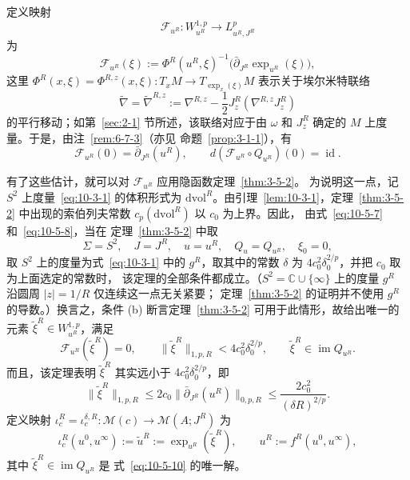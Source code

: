 定义映射
\[
  \mathcal F_{u^R}:W_{u^R}^{1,p}\longrightarrow L_{u^R,J^R}^p
\]
为
\[
  \mathcal F_{u^R}(\xi)
  :=\Phi^R(u^R,\xi)^{-1}
    \bigl(\bar\partial_{J^R}\exp_{u^R}(\xi)\bigr),
\]
这里
$\Phi^R(x,\xi)=\Phi^{R,z}(x,\xi):T_xM\to T_{\exp_x(\xi)}M$
表示关于埃尔米特联络
\[
  \widetilde\nabla=\widetilde\nabla^{R,z}
  :=\nabla^{R,z}-\frac12J_z^R(\nabla^{R,z}J_z^R)
\]
的平行移动；如第~\ref{sec:2-1} 节所述，该联络对应于由 $\omega$ 和 $J_z^R$
确定的 $M$ 上度量。于是，由注~\ref{rem:6-7-3}（亦见
命题~\ref{prop:3-1-1}），有
\begin{equation}\label{eq:10-5-9}
  \mathcal F_{u^R}(0)=\bar\partial_{J^R}(u^R),
  \qquad
  d(\mathcal F_{u^R}\circ Q_{u^R})(0)=\operatorname{id}.
\end{equation}

有了这些估计，就可以对 $\mathcal F_{u^R}$ 应用隐函数定理~\ref{thm:3-5-2}。
为说明这一点，记 $S^2$ 上度量~\eqref{eq:10-3-1} 的体积形式为
$\mathrm{dvol}^R$。由引理~\ref{lem:10-3-1}，定理~\ref{thm:3-5-2}
中出现的索伯列夫常数 $c_p(\mathrm{dvol}^R)$ 以 $c_0$ 为上界。因此，
由式~\eqref{eq:10-5-7} 和~\eqref{eq:10-5-8}，当在
定理~\ref{thm:3-5-2} 中取
\[
  \Sigma=S^2,\quad J=J^R,\quad u=u^R,\quad Q_u=Q_{u^R},
  \quad \xi_0=0,
\]
取 $S^2$ 上的度量为式~\eqref{eq:10-3-1} 中的 $g^R$，取其中的常数
$\delta$ 为 $4c_0^2\delta_0^{2/p}$，并把 $c_0$ 取为上面选定的常数时，
该定理的全部条件都成立。（$S^2=\mathbb C\cup\{\infty\}$ 上的度量
$g^R$ 沿圆周 $|z|=1/R$ 仅连续这一点无关紧要；
定理~\ref{thm:3-5-2} 的证明并不使用 $g^R$ 的导数。）换言之，条件 (b)
断言定理~\ref{thm:3-5-2} 可用于此情形，故给出唯一的元素
$\widetilde\xi^R\in W_{u^R}^{1,p}$，满足
\begin{equation}\label{eq:10-5-10}
  \mathcal F_{u^R}(\widetilde\xi^R)=0,
  \qquad
  \|\widetilde\xi^R\|_{1,p,R}<4c_0^2\delta_0^{2/p},
  \qquad
  \widetilde\xi^R\in\operatorname{im}Q_{u^R}.
\end{equation}
而且，该定理表明 $\widetilde\xi^R$ 其实远小于
$4c_0^2\delta_0^{2/p}$，即
\begin{equation}\label{eq:10-5-11}
  \|\widetilde\xi^R\|_{1,p,R}
  \le2c_0\|\bar\partial_{J^R}(u^R)\|_{0,p,R}
  \le\frac{2c_0^2}{(\delta R)^{2/p}}.
\end{equation}
定义映射
$\iota_c^R=\iota_c^{\delta,R}:\mathcal M(c)\to\mathcal M(A;J^R)$ 为
\begin{equation}\label{eq:10-5-12}
  \iota_c^R(u^0,u^\infty):=\widetilde u^R
  :=\exp_{u^R}(\widetilde\xi^R),
  \qquad u^R:=f^R(u^0,u^\infty),
\end{equation}
其中 $\widetilde\xi^R\in\operatorname{im}Q_{u^R}$ 是
式~\eqref{eq:10-5-10} 的唯一解。

